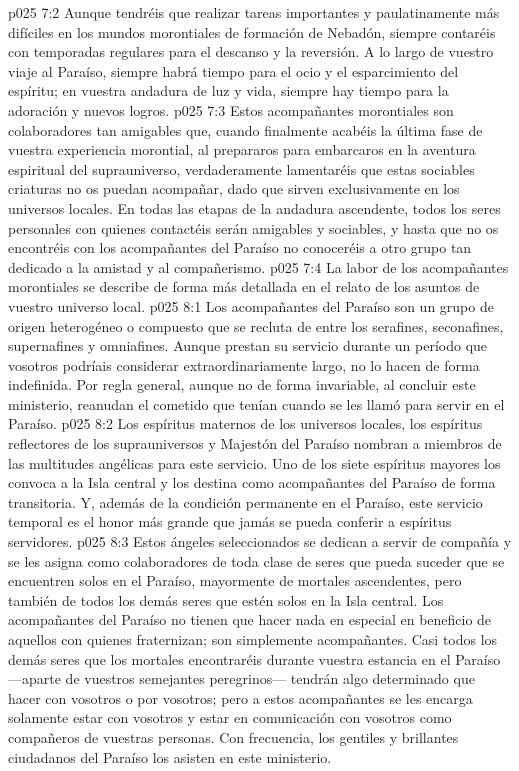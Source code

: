 \vs p025 7:2 Aunque tendréis que realizar tareas importantes y paulatinamente más difíciles en los mundos morontiales de formación de Nebadón, siempre contaréis con temporadas regulares para el descanso y la reversión. A lo largo de vuestro viaje al Paraíso, siempre habrá tiempo para el ocio y el esparcimiento del espíritu; en vuestra andadura de luz y vida, siempre hay tiempo para la adoración y nuevos logros.
\vs p025 7:3 Estos acompañantes morontiales son colaboradores tan amigables que, cuando finalmente acabéis la última fase de vuestra experiencia morontial, al prepararos para embarcaros en la aventura espiritual del suprauniverso, verdaderamente lamentaréis que estas sociables criaturas no os puedan acompañar, dado que sirven exclusivamente en los universos locales. En todas las etapas de la andadura ascendente, todos los seres personales con quienes contactéis serán amigables y sociables, y hasta que no os encontréis con los acompañantes del Paraíso no conoceréis a otro grupo tan dedicado a la amistad y al compañerismo.
\vs p025 7:4 La labor de los acompañantes morontiales se describe de forma más detallada en el relato de los asuntos de vuestro universo local.
\vs p025 8:1 Los acompañantes del Paraíso son un grupo de origen heterogéneo o compuesto que se recluta de entre los serafines, seconafines, supernafines y omniafines. Aunque prestan su servicio durante un período que vosotros podríais considerar extraordinariamente largo, no lo hacen de forma indefinida. Por regla general, aunque no de forma invariable, al concluir este ministerio, reanudan el cometido que tenían cuando se les llamó para servir en el Paraíso.
\vs p025 8:2 Los espíritus maternos de los universos locales, los espíritus reflectores de los suprauniversos y Majestón del Paraíso nombran a miembros de las multitudes angélicas para este servicio. Uno de los siete espíritus mayores los convoca a la Isla central y los destina como acompañantes del Paraíso de forma transitoria. Y, además de la condición permanente en el Paraíso, este servicio temporal es el honor más grande que jamás se pueda conferir a espíritus servidores.
\vs p025 8:3 Estos ángeles seleccionados se dedican a servir de compañía y se les asigna como colaboradores de toda clase de seres que pueda suceder que se encuentren solos en el Paraíso, mayormente de mortales ascendentes, pero también de todos los demás seres que estén solos en la Isla central. Los acompañantes del Paraíso no tienen que hacer nada en especial en beneficio de aquellos con quienes fraternizan; son simplemente acompañantes. Casi todos los demás seres que los mortales encontraréis durante vuestra estancia en el Paraíso ---aparte de vuestros semejantes peregrinos--- tendrán algo determinado que hacer con vosotros o por vosotros; pero a estos acompañantes se les encarga solamente estar con vosotros y estar en comunicación con vosotros como compañeros de vuestras personas. Con frecuencia, los gentiles y brillantes ciudadanos del Paraíso los asisten en este ministerio.
